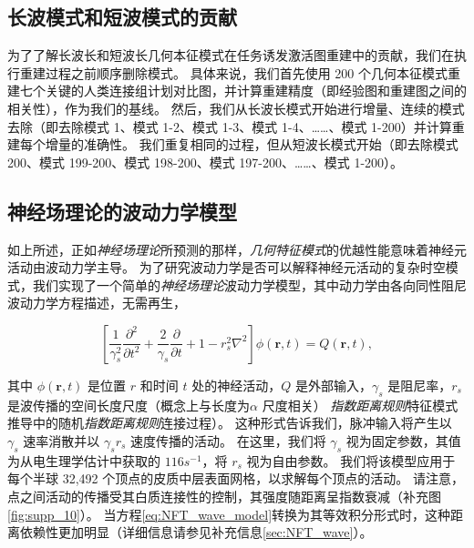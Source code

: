 \documentclass[lang=cn,a4paper,newtx]{elegantpaper}
\begin{document}
\subsection{长波模式和短波模式的贡献} \label{sec:wavelength_contributions}

为了了解长波长和短波长几何本征模式在任务诱发激活图重建中的贡献，我们在执行重建过程之前顺序删除模式。
具体来说，我们首先使用 200 个几何本征模式重建七个关键的人类连接组计划对比图，并计算重建精度（即经验图和重建图之间的相关性），作为我们的基线。
然后，我们从长波长模式开始进行增量、连续的模式去除（即去除模式 1、模式 1-2、模式 1-3、模式 1-4、……、模式 1-200）并计算重建每个增量的准确性。
我们重复相同的过程，但从短波长模式开始（即去除模式 200、模式 199-200、模式 198-200、模式 197-200、……、模式 1-200）。


\subsection{神经场理论的波动力学模型} \label{sec:NFT_model}

如上所述，正如\textit{神经场理论}所预测的那样，\textit{几何特征模式}的优越性能意味着神经元活动由波动力学主导。
为了研究波动力学是否可以解释神经元活动的复杂时空模式，我们实现了一个简单的\textit{神经场理论}波动力学模型，其中动力学由各向同性阻尼波动力学方程描述，无需再生\cite{jirsa1996field,robinson1997propagation}，

\begin{equation}\label{eq:NFT_wave_model}
	[\frac{1}{\gamma_s^2} \frac{\partial ^2}{\partial t^2} + 
	\frac{2}{\gamma_s} \frac{\partial}{\partial t} + 1 - r_s^2 \nabla^2] \phi(\boldsymbol{r}, t) = Q(\boldsymbol{r}, t),
\end{equation}

其中 $ \phi(\boldsymbol{r}, t) $ 是位置 $ r $ 和时间 $ t $ 处的神经活动，$ Q $ 是外部输入，$ \gamma_s $ 是阻尼率，$ r_s $ 是波传播的空间长度尺度（概念上与长度为$ \alpha $ 尺度相关） \textit{指数距离规则}特征模式推导中的随机\textit{指数距离规则}连接过程）。
这种形式告诉我们，脉冲输入将产生以 $ \gamma_s $ 速率消散并以 $ \gamma_s r_s $ 速度传播的活动。
在这里，我们将 $ \gamma_s $ 视为固定参数，其值为从电生理学估计中获取的 $ 116 s^{-1} $\cite{robinson2005multiscale}，将 $ r_s $ 视为自由参数。
我们将该模型应用于每个半球 32,492 个顶点的皮质中层表面网格，以求解每个顶点的活动。
请注意，点之间活动的传播受其白质连接性的控制，其强度随距离呈指数衰减（补充图\ref{fig:supp_10}）。
当方程\ref{eq:NFT_wave_model}转换为其等效积分形式时，这种距离依赖性更加明显（详细信息请参见补充信息\ref{sec:NFT_wave}）。
\end{document}
